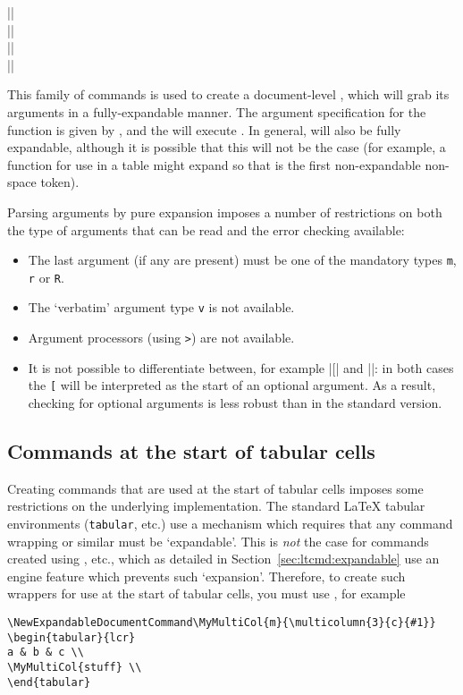 \documentclass{ltxguide}
\begin{document}
\begin{decl}
  |\NewExpandableDocumentCommand|        \\
  |\RenewExpandableDocumentCommand|      \\
  |\ProvideExpandableDocumentCommand|    \\
  |\DeclareExpandableDocumentCommand|   
\end{decl}
This family of commands is used to create a document-level ,
which will grab its arguments in a fully-expandable manner. The
argument specification for the function is given by ,
and the  will execute . In  general,  will
also be fully expandable, although it is possible that this will
not be the case (for example, a function for use in a table might
expand so that  is the first non-expandable non-space token).

Parsing arguments by pure expansion imposes a number of restrictions on
both the type of arguments that can be read and the error checking
available:
\begin{itemize}
  \item The last argument (if any are present) must be one of the
    mandatory types \texttt{m}, \texttt{r} or \texttt{R}.
  \item The `verbatim' argument type \texttt{v} is not available.
  \item Argument processors (using \texttt{>}) are not available.
  \item It is not possible to differentiate between, for example
    |\foo[| and |\foo{[}|: in both cases the \texttt{[} will be
    interpreted as the start of an optional argument. As a
    result, checking for optional arguments is less robust than
    in the standard version.
\end{itemize}

\subsection{Commands at the start of tabular cells}

Creating commands that are used at the start of tabular cells imposes
some restrictions on the underlying implementation. The standard \LaTeX{}
tabular environments (\texttt{tabular}, etc.)  use a mechanism which requires
that any command wrapping  or similar must be
`expandable'. This is \emph{not} the case for commands created using
, etc., which as detailed in
Section~\ref{sec:ltcmd:expandable} use an engine feature which prevents
such `expansion'. Therefore, to create such wrappers for use at the start
of tabular cells, you must use , for example
\begin{verbatim}
\NewExpandableDocumentCommand\MyMultiCol{m}{\multicolumn{3}{c}{#1}}
\begin{tabular}{lcr}
a & b & c \\
\MyMultiCol{stuff} \\
\end{tabular}
\end{verbatim}
\end{document}
